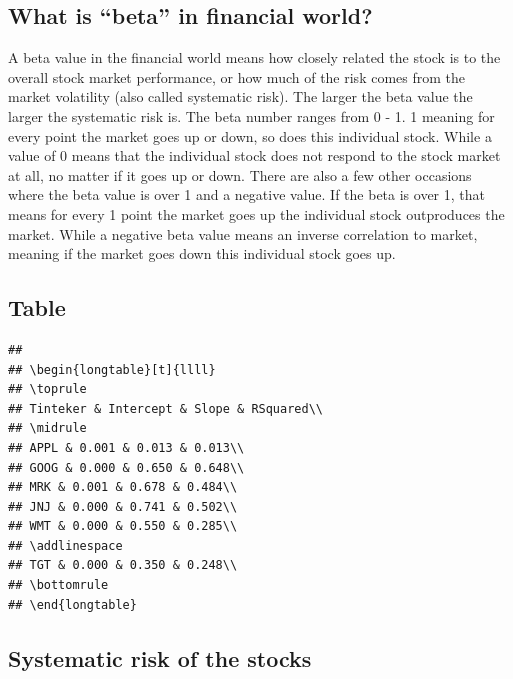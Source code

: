 \documentclass[
]{article}
\begin{document}
\hypertarget{what-is-beta-in-financial-world}{%
\subsection{What is ``beta'' in financial
world?}\label{what-is-beta-in-financial-world}}

A beta value in the financial world means how closely related the stock
is to the overall stock market performance, or how much of the risk
comes from the market volatility (also called systematic risk). The
larger the beta value the larger the systematic risk is. The beta number
ranges from 0 - 1. 1 meaning for every point the market goes up or down,
so does this individual stock. While a value of 0 means that the
individual stock does not respond to the stock market at all, no matter
if it goes up or down. There are also a few other occasions where the
beta value is over 1 and a negative value. If the beta is over 1, that
means for every 1 point the market goes up the individual stock
outproduces the market. While a negative beta value means an inverse
correlation to market, meaning if the market goes down this individual
stock goes up.

\hypertarget{table}{%
\subsection{Table}\label{table}}

\begin{verbatim}
## 
## \begin{longtable}[t]{llll}
## \toprule
## Tinteker & Intercept & Slope & RSquared\\
## \midrule
## APPL & 0.001 & 0.013 & 0.013\\
## GOOG & 0.000 & 0.650 & 0.648\\
## MRK & 0.001 & 0.678 & 0.484\\
## JNJ & 0.000 & 0.741 & 0.502\\
## WMT & 0.000 & 0.550 & 0.285\\
## \addlinespace
## TGT & 0.000 & 0.350 & 0.248\\
## \bottomrule
## \end{longtable}
\end{verbatim}

\hypertarget{systematic-risk-of-the-stocks}{%
\subsection{Systematic risk of the
stocks}\label{systematic-risk-of-the-stocks}}
\end{document}
